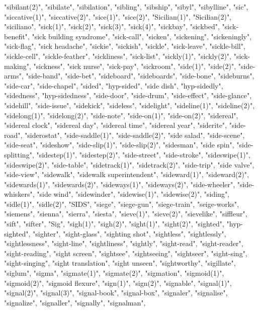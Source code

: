 "sibilant(2)",
"sibilate",
"sibilation",
"sibling",
"sibship",
"sibyl",
"sibylline",
"sic",
"siccative(1)",
"siccative(2)",
"sice(1)",
"sice(2)",
"Sicilian(1)",
"Sicilian(2)",
"siciliano",
"sick(1)",
"sick(2)",
"sick(3)",
"sick(4)",
"sickbay",
"sickbed",
"sick-benefit",
"sick building syndrome",
"sick-call",
"sicken",
"sickening",
"sickeningly",
"sick-flag",
"sick headache",
"sickie",
"sickish",
"sickle",
"sick-leave",
"sickle-bill",
"sickle-cell",
"sickle-feather",
"sickliness",
"sick-list",
"sickly(1)",
"sickly(2)",
"sick-making",
"sickness",
"sick nurse",
"sick-pay",
"sickroom",
"side(1)",
"side(2)",
"side-arms",
"side-band",
"side-bet",
"sideboard",
"sideboards",
"side-bone",
"sideburns",
"side-car",
"side-chapel",
"sided",
"hyp-sided",
"side dish",
"hyp-sidedly",
"sidedness",
"hyp-sidedness",
"side-door",
"side-drum",
"side-effect",
"side-glance",
"sidehill",
"side-issue",
"sidekick",
"sideless",
"sidelight",
"sideline(1)",
"sideline(2)",
"sidelong(1)",
"sidelong(2)",
"side-note",
"side-on(1)",
"side-on(2)",
"sidereal",
"sidereal clock",
"sidereal day",
"sidereal time",
"sidereal year",
"siderite",
"side-road",
"siderostat",
"side-saddle(1)",
"side-saddle(2)",
"side salad",
"side-scene",
"side-seat",
"sideshow",
"side-slip(1)",
"side-slip(2)",
"sidesman",
"side spin",
"side-splitting",
"sidestep(1)",
"sidestep(2)",
"side-street",
"side-stroke",
"sideswipe(1)",
"sideswipe(2)",
"side-table",
"sidetrack(1)",
"sidetrack(2)",
"side-trip",
"side valve",
"side-view",
"sidewalk",
"sidewalk superintendent",
"sideward(1)",
"sideward(2)",
"sidewards(1)",
"sidewards(2)",
"sideways(1)",
"sideways(2)",
"side-wheeler",
"side-whiskers",
"side wind",
"sidewinder",
"sidewise(1)",
"sidewise(2)",
"siding",
"sidle(1)",
"sidle(2)",
"SIDS",
"siege",
"siege-gun",
"siege-train",
"seige-works",
"siemens",
"sienna",
"sierra",
"siesta",
"sieve(1)",
"sieve(2)",
"sievelike",
"siffleur",
"sift",
"sifter",
"Sig",
"sigh(1)",
"sigh(2)",
"sight(1)",
"sight(2)",
"sighted",
"hyp-sighted",
"sighter",
"sight-glass",
"sighting shot",
"sightless",
"sightlessly",
"sightlessness",
"sight-line",
"sightliness",
"sightly",
"sight-read",
"sight-reader",
"sight-reading",
"sight screen",
"sightsee",
"sightseeing",
"sightseer",
"sight-sing",
"sight-singing",
"sight translation",
"sight unseen",
"sightworthy",
"sigillate",
"siglum",
"sigma",
"sigmate(1)",
"sigmate(2)",
"sigmation",
"sigmoid(1)",
"sigmoid(2)",
"sigmoid flexure",
"sign(1)",
"sign(2)",
"signable",
"signal(1)",
"signal(2)",
"signal(3)",
"signal-book",
"signal-box",
"signaler",
"signalise",
"signalize",
"signaller",
"signally",
"signalman",
